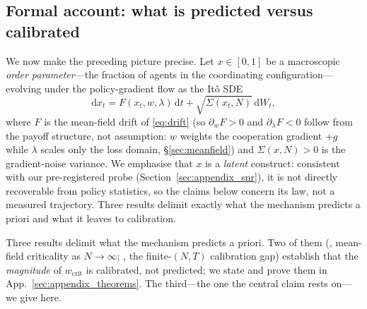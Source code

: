 \documentclass[letterpaper]{article}
\theoremstyle{plain}
\newcommand{\wcrit}{w_{\mathrm{crit}}}
\begin{document}
\subsection{Formal account: what is predicted versus calibrated}
\label{sec:meanfield_theorems}
We now make the preceding picture precise. Let $x\in[0,1]$ be a macroscopic
\emph{order parameter}---the fraction of agents in the coordinating
configuration---evolving under the policy-gradient flow as the It\^o SDE
\begin{equation}
  \mathrm{d}x_t = F(x_t,w,\lambda)\,\mathrm{d}t
    + \sqrt{\Sigma(x_t,N)}\,\mathrm{d}W_t,
  \label{eq:sde}
\end{equation}
where $F$ is the mean-field drift of \eqref{eq:drift} (so $\partial_w F>0$ and
$\partial_\lambda F<0$ follow from the payoff structure, not assumption: $w$
weights the cooperation gradient $+g$ while $\lambda$ scales only the loss
domain, \S\ref{sec:meanfield}) and $\Sigma(x,N)>0$ is the gradient-noise
variance. We emphasise that $x$ is a \emph{latent} construct: consistent with
our pre-registered probe (Section~\ref{sec:appendix_snr}), it is not directly
recoverable from policy statistics, so the claims below concern its law, not a
measured trajectory. Three results delimit exactly what the mechanism predicts
a priori and what it leaves to calibration.

Three results delimit what the mechanism predicts a priori. Two of them
(, mean-field criticality as $N\to\infty$; , the
finite-$(N,T)$ calibration gap) establish that the \emph{magnitude} of $\wcrit$
is calibrated, not predicted; we state and prove them in
App.~\ref{sec:appendix_theorems}. The third---the one the central claim rests
on---we give here.
\end{document}
